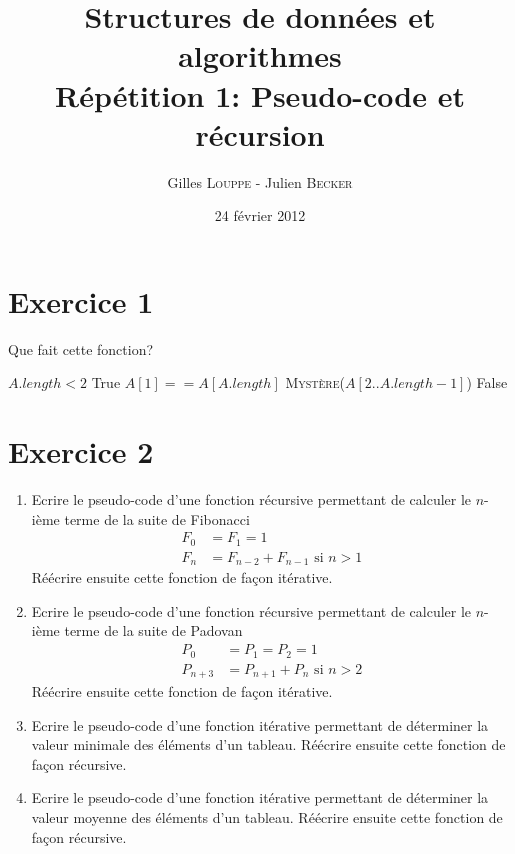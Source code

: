 \documentclass[a4paper,10pt]{article}
\title{
    \textbf{Structures de données et algorithmes}\\
    Répétition 1: Pseudo-code et récursion
}
\author{Gilles \textsc{Louppe} - Julien \textsc{Becker}}
\date{24 février 2012}
\begin{document}
\maketitle

\section*{Exercice 1}

Que fait cette fonction?

\begin{codebox}
    \li \If $A.length < 2$
    \li \Then   \Return True
    \li \Else
    \li       \If $A[1] == A[A.length]$
    \li       \Then \Return \textsc{Mystère}($A[2..A.length-1]$)
    \li       \Else
    \li             \Return False
              \End
        \End
    \End
\end{codebox}

\section*{Exercice 2}

\begin{enumerate}
\item Ecrire le pseudo-code d'une fonction récursive permettant de calculer le $n$-ième terme de la suite de Fibonacci
\begin{align*}
F_0 &= F_1 = 1 \\
F_n &= F_{n-2} + F_{n-1} \text{ si } n > 1
\end{align*}
Réécrire ensuite cette fonction de façon itérative.

\item Ecrire le pseudo-code d'une fonction récursive permettant de calculer le $n$-ième terme de la suite de Padovan
\begin{align*}
P_0 &= P_1 = P_2 = 1 \\
P_{n+3} &= P_{n+1} + P_n \text{ si } n > 2
\end{align*}
Réécrire ensuite cette fonction de façon itérative.

\item Ecrire le pseudo-code d'une fonction itérative permettant de déterminer la valeur minimale des éléments d'un tableau. Réécrire ensuite cette fonction de façon récursive.

\item Ecrire le pseudo-code d'une fonction itérative permettant de déterminer la valeur moyenne des éléments d'un tableau. Réécrire ensuite cette fonction de façon récursive.

\end{enumerate}
\end{document}
